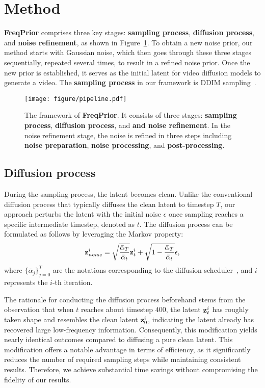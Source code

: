 \section{Method}
\label{sec:method}

\textbf{FreqPrior} comprises three key stages: \textbf{sampling process}, \textbf{diffusion process}, and \textbf{noise refinement}, as shown in Figure~\ref{fig:pipeline}. 
To obtain a new noise prior, our method starts with Gaussian noise, which then goes through these three stages sequentially, 
repeated several times, to result in a refined noise prior. 
Once the new prior is established, it serves as the initial latent for video diffusion models to generate a video.
The {\bf sampling process} in our framework is DDIM sampling~\citep{song2021ddim}.

\begin{figure}
    \centering
    \texttt{[image: figure/pipeline.pdf]}
    \vspace{-5pt}
    \caption{The framework of \textbf{FreqPrior}. It consists of three stages: \textbf{sampling process}, \textbf{diffusion process}, and \textbf{and noise refinement}. 
    In the noise refinement stage, the noise is refined in three steps including \textbf{noise preparation}, \textbf{noise processing}, and \textbf{post-processing}. }
    \label{fig:pipeline}
\end{figure} 
 

\subsection{Diffusion process}
During the sampling process, the latent becomes clean.
Unlike the conventional diffusion process that typically diffuses the clean latent to timestep $T$, our approach perturbs the latent with the initial noise $\epsilon$ once sampling reaches a specific intermediate timestep, denoted as $t$.
The diffusion process can be formulated as follows by leveraging the Markov property:
\begin{equation}
    \mathbf{z}_{noise}^i = \sqrt{\frac{\bar{\alpha}_T}{\bar{\alpha}_t}}\mathbf{z}_t^i+\sqrt{1-\frac{\bar{\alpha}_T}{\bar{\alpha}_t}}\epsilon,
\end{equation}
where $\{\bar\alpha_j\}_{j=0}^T$ are the notations corresponding to the diffusion scheduler~\citep{ho2020denoising}, and $i$ represents the $i$-th iteration.

The rationale for conducting the diffusion process beforehand stems from the observation that when $t$ reaches about timestep $400$, the latent $\mathbf{z}_t^i$ has roughly taken shape and resembles the clean latent $\mathbf{z}_0^i$, indicating the latent already has recovered large low-frequency information.
Consequently, this modification yields nearly identical outcomes compared to diffusing a pure clean latent.
This modification offers a notable advantage in terms of efficiency, as it significantly reduces the number of required sampling steps while maintaining consistent results. 
Therefore, we achieve substantial time savings without compromising the fidelity of our results.

